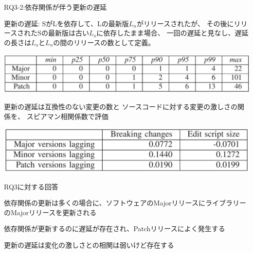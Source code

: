 \begin{frame}{RQ3-2:依存関係が伴う更新の遅延}

{\small
更新の遅延: SがLを依存して、Lの最新版$L_n$がリリースされたが、
その後にリリースされたSの最新版は古い$L_o$に依存したまま場合、
一回の遅延と見なし、遅延の長さは$L_o$と$L_n$の間のリリースの数として定義。
}

\includegraphics[width=\textwidth]{table8}

{\small
更新の遅延は互換性のない変更の数と
ソースコードに対する変更の激しさの関係を、
スピアマン相関係数で評価
}

\includegraphics[width=\textwidth]{table9}

\end{frame}
\begin{frame}{RQ3に対する回答}

{\Large
依存関係の更新は多くの場合に、ソフトウェアのMajorリリースにライブラリーのMajorリリースを更新される
}

\pause\vspace{1em}

{\Large
依存関係が更新するのに遅延が存在され、Patchリリースによく発生する
}

\pause\vspace{1em}

{\Large
更新の遅延は変化の激しさとの相関は弱いけど存在する
}

\end{frame}
